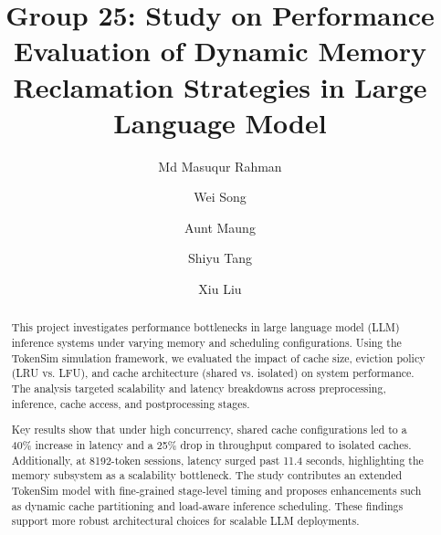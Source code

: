 \documentclass[sigconf,nonacm]{acmart}
\begin{document}
\title{Group 25: Study on Performance Evaluation of Dynamic Memory Reclamation Strategies in Large Language Model}

\author{Md Masuqur Rahman}

\author{Wei Song}
\author{Aunt Maung}

\author{Shiyu Tang}

\author{Xiu Liu}
 

 

\begin{abstract}
This project investigates performance bottlenecks in large language model (LLM) inference systems under varying memory and scheduling configurations. Using the TokenSim simulation framework, we evaluated the impact of cache size, eviction policy (LRU vs. LFU), and cache architecture (shared vs. isolated) on system performance. The analysis targeted scalability and latency breakdowns across preprocessing, inference, cache access, and postprocessing stages.

\par Key results show that under high concurrency, shared cache configurations led to a 40\% increase in latency and a 25\% drop in throughput compared to isolated caches. Additionally, at 8192-token sessions, latency surged past 11.4 seconds, highlighting the memory subsystem as a scalability bottleneck. The study contributes an extended TokenSim model with fine-grained stage-level timing and proposes enhancements such as dynamic cache partitioning and load-aware inference scheduling. These findings support more robust architectural choices for scalable LLM deployments.
 
\end{abstract}
\end{document}
